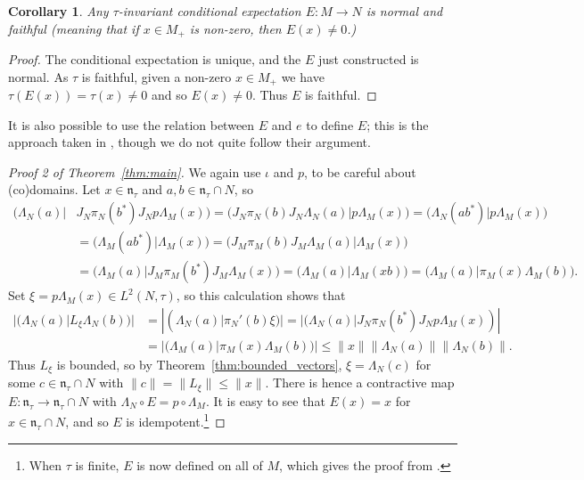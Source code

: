 \documentclass[a4paper,11pt]{article}
\newcommand{\mf}[1]{{\mathfrak{#1}}}
\newtheorem{corollary}[lemma]{Corollary}
\theoremstyle{definition}
\begin{document}
\begin{corollary}
Any $\tau$-invariant conditional expectation $E\colon M\to N$ is normal and faithful (meaning that if $x\in M_+$ is non-zero, then $E(x)\not=0$.)
\end{corollary}
\begin{proof}
The conditional expectation is unique, and the $E$ just constructed is normal.  As $\tau$ is faithful, given a non-zero $x\in M_+$ we have $\tau(E(x))=\tau(x)\not=0$ and so $E(x)\not=0$.  Thus $E$ is faithful.
\end{proof}

It is also possible to use the relation between $E$ and $e$ to define $E$; this is the approach taken in \cite[Section~3.6]{SinclairSmith_FiniteVNBook}, though we do not quite follow their argument.

\begin{proof}[{Proof 2 of Theorem~\ref{thm:main}}]
We again use $\iota$ and $p$, to be careful about (co)domains.  Let $x\in\mf n_\tau$ and $a,b\in \mf n_\tau \cap N$, so
\begin{align*}
\big( \Lambda_N(a) \big|  &  J_N \pi_N(b^*) J_N p \Lambda_M(x) \big)
= \big( J_N \pi_N(b) J_N \Lambda_N(a) \big| p \Lambda_M(x) \big)
= \big( \Lambda_N(ab^*) \big| p \Lambda_M(x) \big) \\
&= \big( \Lambda_M(ab^*) \big| \Lambda_M(x) \big)
= \big( J_M\pi_M(b)J_M \Lambda_M(a) \big| \Lambda_M(x) \big) \\
&= \big( \Lambda_M(a) \big| J_M\pi_M(b^*)J_M \Lambda_M(x) \big)
= \big( \Lambda_M(a) \big| \Lambda_M(xb) \big)
= \big( \Lambda_M(a) \big| \pi_M(x) \Lambda_M(b) \big).
\end{align*}
Set $\xi = p\Lambda_M(x) \in L^2(N,\tau)$, so this calculation shows that
\begin{align*}
|(\Lambda_N(a)|L_\xi\Lambda_N(b))|
&= |(\Lambda_N(a)|\pi_N'(b)\xi)|
= |(\Lambda_N(a)|J_N\pi_N(b^*)J_N p \Lambda_M(x))|  \\
&= |( \Lambda_M(a) | \pi_M(x) \Lambda_M(b) )|
\leq \|x\| \|\Lambda_N(a)\| \| \Lambda_N(b)\|.
\end{align*}
Thus $L_\xi$ is bounded, so by Theorem~\ref{thm:bounded_vectors}, $\xi = \Lambda_N(c)$ for some $c\in \mf n_\tau \cap N$ with $\|c\| = \|L_\xi\| \leq \|x\|$.  There is hence a contractive map $E \colon \mf n_\tau \to \mf n_\tau\cap N$ with $\Lambda_N \circ E = p \circ \Lambda_M$.  It is easy to see that $E(x)=x$ for $x\in \mf n_\tau \cap N$, and so $E$ is idempotent.\footnote{When $\tau$ is finite, $E$ is now defined on all of $M$, which gives the proof from \cite[Section~3.6]{SinclairSmith_FiniteVNBook}.}


\end{proof}
\end{document}
